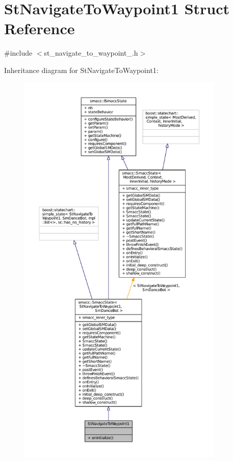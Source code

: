 \hypertarget{structStNavigateToWaypoint1}{}\section{St\+Navigate\+To\+Waypoint1 Struct Reference}
\label{structStNavigateToWaypoint1}


{\ttfamily \#include $<$st\+\_\+navigate\+\_\+to\+\_\+waypoint\+\_.\+h$>$}



Inheritance diagram for St\+Navigate\+To\+Waypoint1\+:
\nopagebreak
\begin{figure}[H]
\begin{center}
\leavevmode
\includegraphics[height=550pt]{structStNavigateToWaypoint1__inherit__graph}
\end{center}
\end{figure}


